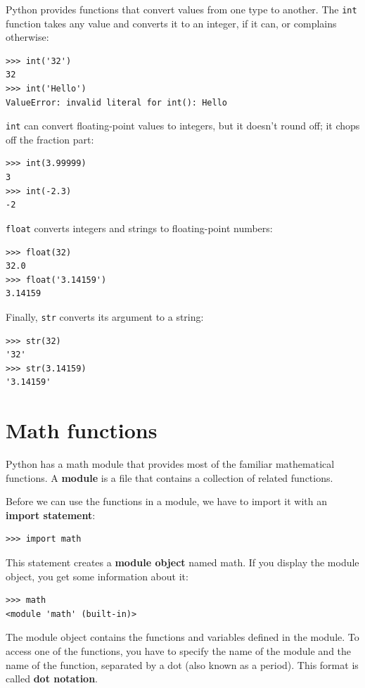 \documentclass[10pt]{book}
\begin{document}
Python provides functions that convert values
from one type to another.  The {\tt int} function takes any value and
converts it to an integer, if it can, or complains otherwise:

\begin{verbatim}
>>> int('32')
32
>>> int('Hello')
ValueError: invalid literal for int(): Hello
\end{verbatim}
%
{\tt int} can convert floating-point values to integers, but it
doesn't round off; it chops off the fraction part:

\begin{verbatim}
>>> int(3.99999)
3
>>> int(-2.3)
-2
\end{verbatim}
%
{\tt float} converts integers and strings to floating-point
numbers:

\begin{verbatim}
>>> float(32)
32.0
>>> float('3.14159')
3.14159
\end{verbatim}
%
Finally, {\tt str} converts its argument to a string:

\begin{verbatim}
>>> str(32)
'32'
>>> str(3.14159)
'3.14159'
\end{verbatim}
%

\section{Math functions}

Python has a math module that provides most of the familiar
mathematical functions.  A {\bf module} is a file that contains a
collection of related functions.

Before we can use the functions in a module, we have to import it with
an {\bf import statement}:

\begin{verbatim}
>>> import math
\end{verbatim}
%
This statement creates a {\bf module object} named math.  If
you display the module object, you get some information about it:

\begin{verbatim}
>>> math
<module 'math' (built-in)>
\end{verbatim}
%
The module object contains the functions and variables defined in the
module.  To access one of the functions, you have to specify the name
of the module and the name of the function, separated by a dot (also
known as a period).  This format is called {\bf dot notation}.
\end{document}
